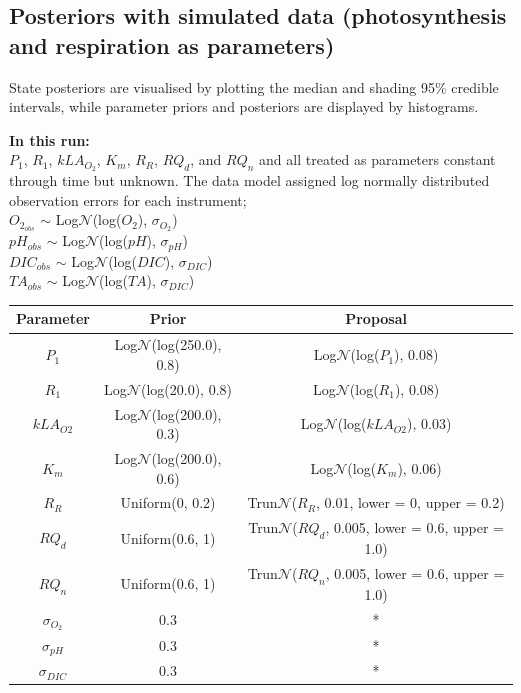 \documentclass{ruthesis}
\begin{document}
\FloatBarrier
\subsection{Posteriors with simulated data (photosynthesis and respiration as parameters)}\label{sec:micro_sim_results1}

State posteriors are visualised by plotting the median and shading 95\% credible intervals, while parameter priors and posteriors are displayed by histograms.

\textbf{In this run:}\\
$P_1$, $R_1$, $kLA_{O_2}$, $K_m$, $R_R$, $RQ_d$, and $RQ_n$ and all treated as parameters constant through time but unknown. The data model assigned log normally distributed observation errors for each instrument;\\
$O_{2_{obs}}$ $\sim$ Log$\mathcal{N}$(log($O_2$), $\sigma_{O_2}$)\\
$pH_{obs}$ $\sim$ Log$\mathcal{N}$(log($pH$),  $\sigma_{pH}$)\\
$DIC_{obs}$ $\sim$ Log$\mathcal{N}$(log($DIC$), $\sigma_{DIC}$)\\
$TA_{obs}$ $\sim$ Log$\mathcal{N}$(log($TA$), $\sigma_{DIC}$)\\

\begin{tabular}{c | c  |  c}
	\hline
	\bfseries{Parameter} & \bfseries{Prior} &  \bfseries{Proposal} \\ \hline
	$P_1$  		& Log$\mathcal{N}$(log(250.0), 0.8)  & Log$\mathcal{N}$(log($P_1$), 0.08)   \\
	$R_1$  		& Log$\mathcal{N}$(log(20.0), 0.8)   & Log$\mathcal{N}$(log($R_1$), 0.08)   \\
	$kLA_{O2}$  & Log$\mathcal{N}$(log(200.0), 0.3)  & Log$\mathcal{N}$(log($kLA_{O2}$), 0.03) \\
	$K_m$ 		&  Log$\mathcal{N}$(log(200.0), 0.6) & Log$\mathcal{N}$(log($K_m$), 0.06) \\
	$R_R$  		& Uniform(0, 0.2) &  Trun$\mathcal{N}$($R_R$, 0.01, lower = 0, upper = 0.2) \\
	$RQ_d$  	& Uniform(0.6, 1) &  Trun$\mathcal{N}$($RQ_d$, 0.005, lower = 0.6, upper = 1.0)\\
	$RQ_n$  	& Uniform(0.6, 1) &  Trun$\mathcal{N}$($RQ_n$, 0.005, lower = 0.6, upper = 1.0)\\
	$\sigma_{O_2}$ 	& 0.3 	& * \\
	$\sigma_{pH}$ 	& 0.3 	& * \\
	$\sigma_{DIC}$ 	& 0.3 	& * \\	
\end{tabular}
\end{document}
